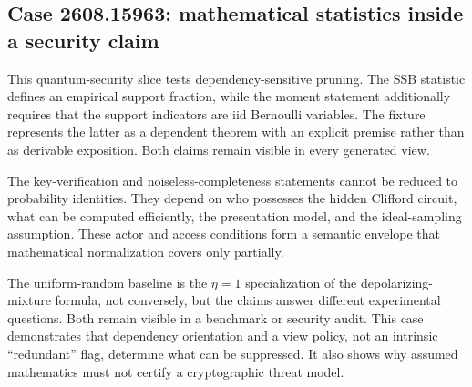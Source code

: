 \subsection{Case 2608.15963: mathematical statistics inside a security claim}\label{case:contrib-15963}

This quantum-security slice tests dependency-sensitive pruning. The SSB statistic defines an empirical support fraction, while the moment statement additionally requires that the support indicators are iid Bernoulli variables. The fixture represents the latter as a dependent theorem with an explicit premise rather than as derivable exposition. Both claims remain visible in every generated view.

The key-verification and noiseless-completeness statements cannot be reduced to probability identities. They depend on who possesses the hidden Clifford circuit, what can be computed efficiently, the presentation model, and the ideal-sampling assumption. These actor and access conditions form a semantic envelope that mathematical normalization covers only partially.

The uniform-random baseline is the $\eta=1$ specialization of the depolarizing-mixture formula, not conversely, but the claims answer different experimental questions. Both remain visible in a benchmark or security audit. This case demonstrates that dependency orientation and a view policy, not an intrinsic ``redundant'' flag, determine what can be suppressed. It also shows why assumed mathematics must not certify a cryptographic threat model.